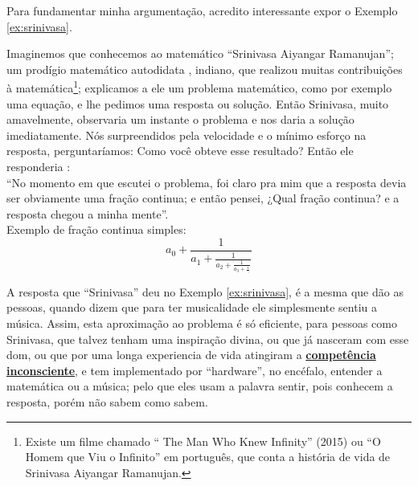Para fundamentar minha argumentação, acredito interessante expor o Exemplo \ref{ex:srinivasa}. 
\begin{example}
\label{ex:srinivasa}
Imaginemos que conhecemos ao matemático ``Srinivasa Aiyangar Ramanujan'';
um prodígio matemático autodidata \cite[pp. 1]{kanigel2016man}, indiano, que 
realizou muitas contribuições à matemática\footnote{Existe 
um filme chamado `` The Man Who Knew Infinity'' (2015) ou 
``O Homem que Viu o Infinito'' em português, que conta a história de vida de Srinivasa Aiyangar Ramanujan.};
explicamos a ele um problema  matemático, 
como por exemplo uma equação,
e  lhe pedimos uma resposta ou solução. 
Então Srinivasa, muito amavelmente, 
observaria um instante o problema e nos daria a solução imediatamente.
Nós surpreendidos pela velocidade e o mínimo esforço na resposta,
perguntaríamos: Como você obteve esse resultado? Então ele responderia \cite[pp. 235]{kanigel2016man}:\\

``No momento em que escutei o problema, 
foi claro pra mim que a resposta devia ser obviamente uma fração continua; 
e então pensei, ¿Qual fração continua? e a resposta chegou a minha mente''.\\

Exemplo de fração continua simples:
\begin{equation}
a_{0}+{\frac {1}{a_{1}+{\frac {1}{a_{2}+{\frac {1}{a_{3}+{\frac {1}{\ddots }}}}}}}}
\end{equation}
\end{example}

A resposta que ``Srinivasa'' deu no Exemplo  \ref{ex:srinivasa}, 
é a mesma  que dão as pessoas, quando  dizem que para ter musicalidade ele simplesmente sentiu a música. 
Assim, esta aproximação ao problema é só eficiente, para pessoas como Srinivasa, 
que talvez tenham uma inspiração divina, 
ou que já nasceram com esse dom, ou que por uma longa experiencia de vida atingiram 
a \hyperref[ref:CompetenciaInconsciente]{\textbf{competência inconsciente}}, 
e tem implementado por ``hardware'', no encéfalo, entender a matemática ou a música; 
pelo que eles usam a palavra sentir, 
pois conhecem a resposta, porém não sabem como sabem. 

